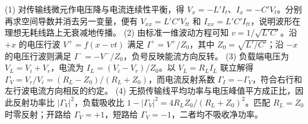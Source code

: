 (1) 对传输线微元作电压降与电流连续性平衡，得 \(V_x=-L'I_t\)、\(I_x=-C'V_t\)。分别再求空间导数并消去另一变量，便有 \(V_{xx}=L'C'V_{tt}\) 和 \(I_{xx}=L'C'I_{tt}\)，说明波形在理想无耗线路上无衰减地传播。
(2) 由标准一维波动方程可知 \(v=1/\sqrt{L'C'}\)。沿 \(+x\) 的电压行波 \(V^+=f(x-vt)\) 满足 \(I^+=V^+/Z_0\)，其中 \(Z_0=\sqrt{L'/C'}\)；沿 \(-x\) 的电压行波则满足 \(I^-=-V^-/Z_0\)，负号反映能流方向反转。
(3) 负载端电压为 \(V_L=V_i+V_r\)，电流为 \(I_L=(V_i-V_r)/Z_0\)。以 \(V_L=R_LI_L\) 联立解得 \(\Gamma_V=V_r/V_i=(R_L-Z_0)/(R_L+Z_0)\)，而电流反射系数 \(\Gamma_I=-\Gamma_V\)，符合右行和左行波电流方向相反的约定。
(4) 无损传输线平均功率与电压峰值平方成正比，因此反射功率比 \(|\Gamma_V|^2\)，负载吸收比 \(1-|\Gamma_V|^2=4R_LZ_0/(R_L+Z_0)^2\)。匹配 \(R_L=Z_0\) 时零反射；开路给 \(\Gamma_V=+1\)，短路给 \(\Gamma_V=-1\)，二者均不吸收净功率。
